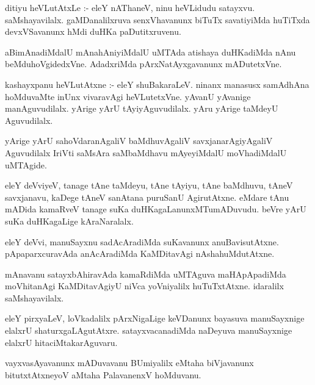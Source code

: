\documentclass{article}
\begin{document}


\begin{mn}
ditiyu heVLutAtxLe :- eleY nAThaneV, ninu heVLidudu satayxvu. saMshayavilalx. 
gaMDanalilxruva senxVhavanunx biTuTx savatiyiMda huTiTxda devxVSavanunx 
hMdi duHKa paDutitxruvenu. 
\end{mn}

\begin{mn}
aBimAnadiMdalU mAnahAniyiMdalU uMTAda atishaya duHKadiMda nAnu 
beMduhoVgidedxVne.  AdadxriMda pArxNatAyxgavanunx mADutetxVne.
\end{mn}

\begin{mn}
kashayxpanu heVLutAtxne :- eleY shuBakaraLeV. ninanx manasusx samAdhAna
hoMduvaMte inUnx vivaravAgi heVLutetxVne. yAvanU yAvanige manAguvudilalx.  
yArige yArU tAyiyAguvudilalx.  yAru yArige  taMdeyU Aguvudilalx.
\end{mn}

\begin{mn}
yArige yArU sahoVdaranAgaliV baMdhuvAgaliV savxjanarAgiyAgaliV  Aguvudilalx 
 IriVti saMsAra saMbaMdhavu mAyeyiMdalU moVhadiMdalU uMTAgide.
\end{mn}

\begin{mn}
eleY deVviyeV, tanage tAne taMdeyu, tAne tAyiyu, tAne baMdhuvu, tAneV savxjanavu,
kaDege tAneV sanAtana puruSanU  AgirutAtxne.  eMdare tAnu mADida kamaRveV 
tanage suKa duHKagaLanunxMTumADuvudu. beVre yArU suKa duHKagaLige kAraNaralalx.
\end{mn}

\begin{mn}
eleY deVvi, manuSayxnu sadAcAradiMda suKavanunx anuBavisutAtxne. pApaparxcuravAda
anAcAradiMda KaMDitavAgi nAshahuMdutAtxne.
\end{mn}

\begin{mn}
mAnavanu satayxbAhiravAda kamaRdiMda uMTAguva maHApApadiMda moVhitanAgi 
KaMDitavAgiyU niVca yoVniyalilx huTuTxtAtxne. idaralilx saMshayavilalx.
\end{mn}
 
\begin{mn}
eleY pirxyaLeV, loVkadalilx pArxNigaLige keVDanunx bayasuva manuSayxnige 
 elalxrU shaturxgaLAgutAtxre. satayxvacanadiMda naDeyuva manuSayxnige
 elalxrU hitaciMtakarAguvaru.
\end{mn}

\begin{mn}
vayxvasAyavanunx mADuvavanu BUmiyalilx eMtaha biVjavanunx bitutxtAtxneyoV
 aMtaha PalavanenxV hoMduvanu. 
\end{mn}
\end{document}

